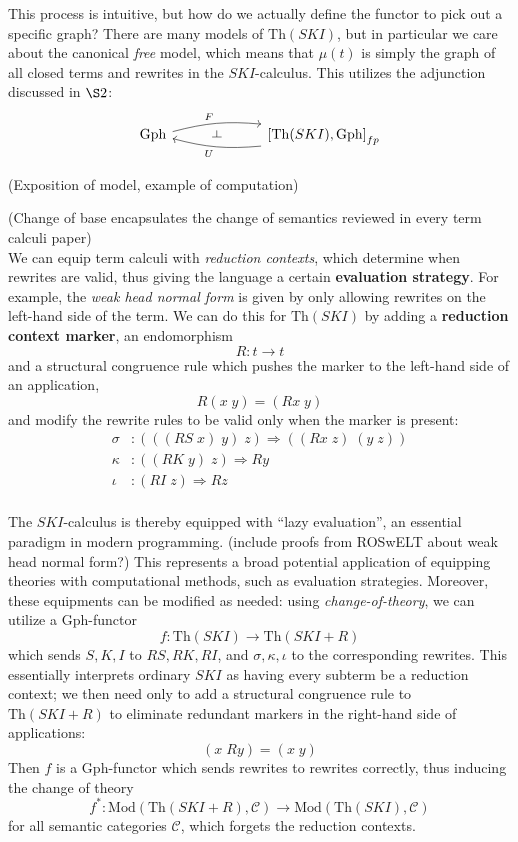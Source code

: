 \documentclass[a4paper,UKenglish]{article}
\theoremstyle{definition}
\def\ld{\rotatebox[origin=c]{-90}{$\dashv$}} %
\newcommand{\Th}{\mathrm{Th}}
\newcommand{\Gph}{\mathrm{Gph}}
\newcommand{\Mod}{\mathrm{Mod}}
\newcommand{\C}{\mathscr{C}}
\begin{document}
This process is intuitive, but how do we actually define the functor to pick out a specific graph? There are many models of $\Th(SKI)$, but in particular we care about the canonical \textit{free} model, which means that $\mu(t)$ is simply the graph of all closed terms and rewrites in the $SKI$-calculus. This utilizes the adjunction discussed in $\S2$:
\[
\begin{tikzcd}
\Gph \arrow[bend left=10,below]{rr}{F}
& \ld &
\arrow[bend left=10,above]{ll}{U} \left[\Th(SKI),\Gph\right]_{fp}
\end{tikzcd}
\]

(Exposition of model, example of computation)

(Change of base encapsulates the change of semantics reviewed in every term calculi paper)\\

We can equip term calculi with \textit{reduction contexts}, which determine when rewrites are valid, thus giving the language a certain \textbf{evaluation strategy}. For example, the \textit{weak head normal form} is given by only allowing rewrites on the left-hand side of the term. We can do this for $\Th(SKI)$ by adding a \textbf{reduction context marker}, an endomorphism $$R: t \to t$$ and a structural congruence rule which pushes the marker to the left-hand side of an application, $$R(x\; y) = (Rx\; y)$$ and modify the rewrite rules to be valid only when the marker is present: 
\[\begin{array}{rl}
\sigma & :(((RS\; x)\; y)\; z) \Rightarrow ((Rx\; z)\; (y\; z))\\
\kappa & :((RK\; y)\; z) \Rightarrow Ry\\
\iota & :(RI\; z) \Rightarrow Rz\\
\end{array}
\]

The $SKI$-calculus is thereby equipped with ``lazy evaluation'', an essential paradigm in modern programming. (include proofs from ROSwELT about weak head normal form?) This represents a broad potential application of equipping theories with computational methods, such as evaluation strategies. Moreover, these equipments can be modified as needed: using \textit{change-of-theory}, we can utilize a $\Gph$-functor $$f: \Th(SKI) \to \Th(SKI+R)$$ which sends $S,K,I$ to $RS,RK,RI$, and $\sigma, \kappa, \iota$ to the corresponding rewrites. This essentially interprets ordinary $SKI$ as having every subterm be a reduction context; we then need only to add a structural congruence rule to $\Th(SKI+R)$ to eliminate redundant markers in the right-hand side of applications: $$(x\; Ry) = (x\; y)$$ Then $f$ is a $\Gph$-functor which sends rewrites to rewrites correctly, thus inducing the change of theory $$f^*: \Mod(\Th(SKI+R),\C) \to \Mod(\Th(SKI),\C)$$ for all semantic categories $\C$, which forgets the reduction contexts.
\end{document}
